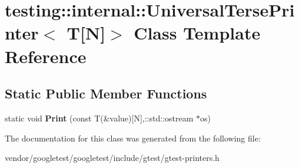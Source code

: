 \hypertarget{classtesting_1_1internal_1_1UniversalTersePrinter_3_01T[N]_4}{}\section{testing\+:\+:internal\+:\+:Universal\+Terse\+Printer$<$ T\mbox{[}N\mbox{]}$>$ Class Template Reference}
\label{classtesting_1_1internal_1_1UniversalTersePrinter_3_01T[N]_4}
\subsection*{Static Public Member Functions}
\begin{DoxyCompactItemize}
\item 
static void {\bfseries Print} (const T(\&value)\mbox{[}N\mbox{]},\+::std\+::ostream $\ast$os)\hypertarget{classtesting_1_1internal_1_1UniversalTersePrinter_3_01T[N]_4_ab86be2fbff7bb8fb2113e9ade3899a56}{}\label{classtesting_1_1internal_1_1UniversalTersePrinter_3_01T[N]_4_ab86be2fbff7bb8fb2113e9ade3899a56}

\end{DoxyCompactItemize}


The documentation for this class was generated from the following file\+:\begin{DoxyCompactItemize}
\item 
vendor/googletest/googletest/include/gtest/gtest-\/printers.\+h\end{DoxyCompactItemize}
